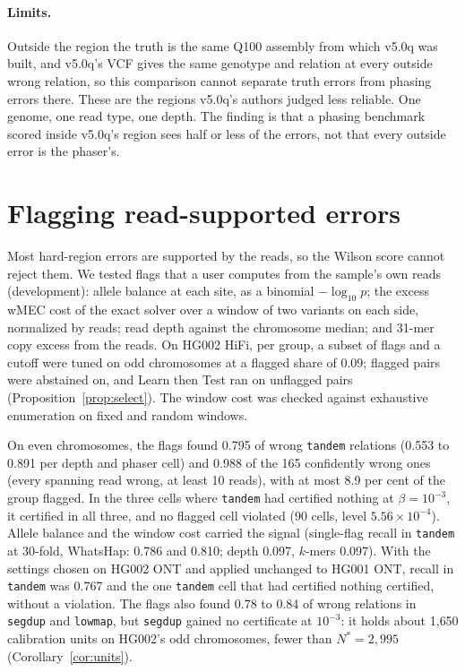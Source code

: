 \documentclass[11pt]{article}
\theoremstyle{definition}
\theoremstyle{remark}
\begin{document}
\paragraph{Limits.} Outside the region the truth is the same Q100 assembly
from which v5.0q was built, and v5.0q's VCF gives the same genotype and
relation at every outside wrong relation, so this comparison cannot
separate truth errors from phasing errors there. These are the regions
v5.0q's authors judged less reliable. One genome, one read type, one depth.
The finding is that a phasing benchmark scored inside v5.0q's region sees
half or less of the errors, not that every outside error is the phaser's.

\section{Flagging read-supported errors}\label{sec:flags}

Most hard-region errors are supported by the reads, so the Wilson score
cannot reject them. We tested flags that a user computes from the sample's
own reads (development): allele balance at each site, as a binomial
$-\log_{10}p$; the excess wMEC cost of the exact solver over a window of two
variants on each side, normalized by reads; read depth against the
chromosome median; and 31-mer copy excess from the reads. On HG002 HiFi,
per group, a subset of flags and a cutoff were tuned on odd chromosomes at a
flagged share of 0.09; flagged pairs were abstained on, and Learn then Test
ran on unflagged pairs (Proposition~\ref{prop:select}). The window cost was
checked against exhaustive enumeration on fixed and random windows.

On even chromosomes, the flags found 0.795 of wrong \texttt{tandem}
relations (0.553 to 0.891 per depth and phaser cell) and 0.988 of the 165
confidently wrong ones (every spanning read wrong, at least 10 reads), with
at most 8.9 per cent of the group flagged. In the three cells where
\texttt{tandem} had certified nothing at $\beta=10^{-3}$, it certified in all
three, and no flagged cell violated (90 cells, level
$5.56\times10^{-4}$). Allele balance and the window cost carried the signal
(single-flag recall in \texttt{tandem} at 30-fold, WhatsHap: 0.786 and 0.810;
depth 0.097, $k$-mers 0.097). With the settings chosen on HG002 ONT and
applied unchanged to HG001 ONT, recall in \texttt{tandem} was 0.767 and the
one \texttt{tandem} cell that had certified nothing certified, without a
violation. The flags also found 0.78 to 0.84 of wrong relations in
\texttt{segdup} and \texttt{lowmap}, but \texttt{segdup} gained no
certificate at $10^{-3}$: it holds about 1{,}650 calibration units on HG002's
odd chromosomes, fewer than $N^*=2{,}995$ (Corollary~\ref{cor:units}).
\end{document}
